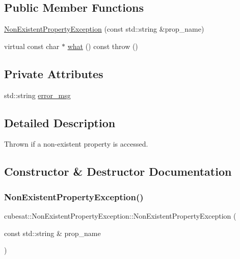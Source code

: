 \subsection*{Public Member Functions}
\begin{DoxyCompactItemize}
\item 
\hyperlink{classcubesat_1_1NonExistentPropertyException_ac2d60c530b7838ec136e68193caad115}{Non\+Existent\+Property\+Exception} (const std\+::string \&prop\+\_\+name)
\item 
virtual const char $\ast$ \hyperlink{classcubesat_1_1NonExistentPropertyException_a160909d63d9d602a4151e32d8719ec58}{what} () const  throw ()
\end{DoxyCompactItemize}
\subsection*{Private Attributes}
\begin{DoxyCompactItemize}
\item 
std\+::string \hyperlink{classcubesat_1_1NonExistentPropertyException_a31c5141863cf737c22e0c1f5a8b05375}{error\+\_\+msg}
\end{DoxyCompactItemize}


\subsection{Detailed Description}
Thrown if a non-\/existent property is accessed. 

\subsection{Constructor \& Destructor Documentation}
\mbox{\label{classcubesat_1_1NonExistentPropertyException_ac2d60c530b7838ec136e68193caad115}} 
\subsubsection{\texorpdfstring{Non\+Existent\+Property\+Exception()}{NonExistentPropertyException()}}
{\footnotesize\ttfamily cubesat\+::\+Non\+Existent\+Property\+Exception\+::\+Non\+Existent\+Property\+Exception (\begin{DoxyParamCaption}\item[{const std\+::string \&}]{prop\+\_\+name }\end{DoxyParamCaption})\hspace{0.3cm}{\ttfamily [inline]}}



